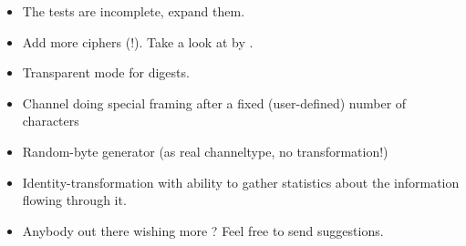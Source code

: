 \documentclass {report}
\begin{document}
\begin {itemize}
\item	The tests are incomplete, expand them.
\item	Add more ciphers (\PGP!). Take a look at \pgplib{} by \tage{}.
\item	Transparent mode for digests.
\item	Channel doing special framing after a fixed (user-defined)
	number of characters
\item	Random-byte generator (as real channeltype, no transformation!)
\item	Identity-transformation with ability to gather statistics
	about the information flowing through it.
\item	Anybody out there wishing more ? Feel free to send \me{}
	suggestions.
\end   {itemize}


\printindex
\end{document}
